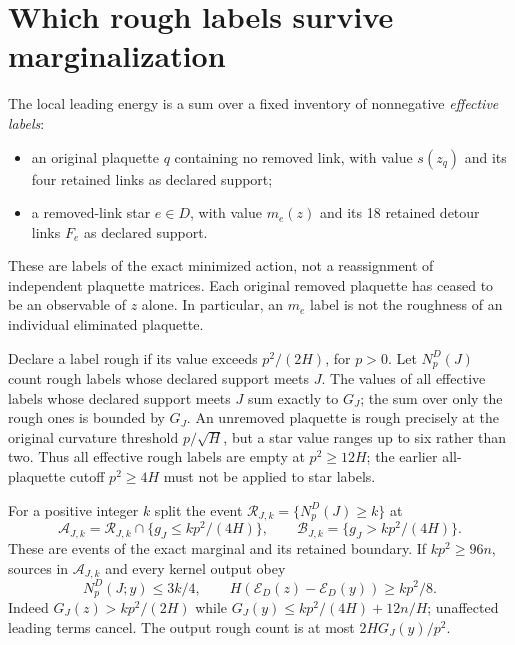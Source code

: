 \documentclass[11pt]{article}
\theoremstyle{definition}
\theoremstyle{remark}
\begin{document}
\section{Which rough labels survive marginalization}
The local leading energy is a sum over a fixed inventory of nonnegative
\emph{effective labels}:
\begin{itemize}
\item an original plaquette $q$ containing no removed link, with
value $s(z_q)$ and its four retained links as declared support;
\item a removed-link star $e\in D$, with value $m_e(z)$ and its 18
retained detour links $F_e$ as declared support.
\end{itemize}
These are labels of the exact minimized action, not a reassignment of
independent plaquette matrices. Each original removed plaquette has
ceased to be an observable of $z$ alone. In particular, an $m_e$ label
is not the roughness of an individual eliminated plaquette.

Declare a label rough if its value exceeds $p^2/(2H)$, for $p>0$.
Let $N_p^D(J)$ count rough labels whose declared support meets $J$.
The values of all effective labels whose declared support meets $J$ sum
exactly to $G_J$; the sum over only the rough ones is bounded by $G_J$.
An unremoved plaquette is rough
precisely at the original curvature threshold $p/\sqrt H$, but a star
value ranges up to six rather than two. Thus all effective rough labels
are empty at $p^2\ge12H$; the earlier all-plaquette cutoff $p^2\ge4H$
must not be applied to star labels.

For a positive integer $k$ split the event
$\mathcal R_{J,k}=\{N_p^D(J)\ge k\}$ at
\begin{equation}
 \mathcal A_{J,k}=\mathcal R_{J,k}\cap\{g_J\le kp^2/(4H)\},\qquad
 \mathcal B_{J,k}=\{g_J>kp^2/(4H)\}.
 \label{eq:split_events}
\end{equation}
These are events of the exact marginal and its retained boundary.
If $kp^2\ge96n$, sources in $\mathcal A_{J,k}$ and every kernel output
obey
\begin{equation}
 N_p^D(J;y)\le3k/4,\qquad
 H(\mathcal E_D(z)-\mathcal E_D(y))\ge kp^2/8.
 \label{eq:gain}
\end{equation}
Indeed $G_J(z)>kp^2/(2H)$ while
$G_J(y)\le kp^2/(4H)+12n/H$; unaffected leading terms cancel. The
output rough count is at most $2HG_J(y)/p^2$.
\end{document}
